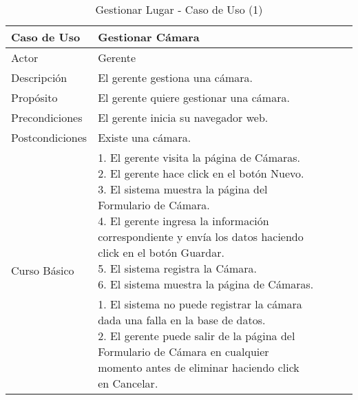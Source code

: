 \begin{table}[H]
    \begin{tabular}{@{} *5l @{}} \toprule
    \textbf{Caso de Uso} & Gestionar Cámara \\ \midrule
    Actor & Gerente \\ 
    Descripción & El gerente gestiona una cámara. \\ 
    Propósito & El gerente quiere gestionar una cámara. \\ \midrule
    Precondiciones & El gerente inicia su navegador web. \\ \midrule
    Postcondiciones & Existe una cámara. \\ \midrule
    \multirow{4}{*}{Curso Básico}
        & \parbox{0.75\linewidth}{ 
                1. El gerente visita la página de Cámaras. \\
                2. El gerente hace click en el botón Nuevo. \\
                3. El sistema muestra la página del Formulario de Cámara. \\
                4. El gerente ingresa la información correspondiente y envía los datos haciendo click en el botón Guardar. \\
                5. El sistema registra la Cámara.  \\
                6. El sistema muestra la página de Cámaras.   
        } \\ \midrule
        & \parbox{0.75\linewidth}{ 
            1. El sistema no puede registrar la cámara dada una falla en la base de datos. \\
            2. El gerente puede salir de la página del Formulario de Cámara en cualquier momento antes de eliminar haciendo click en Cancelar.
        }  \\  \bottomrule
     \hline
    \end{tabular}
        \caption{Gestionar Lugar - Caso de Uso (1)}
        \label{tab:tabcu-cam}
\end{table}


